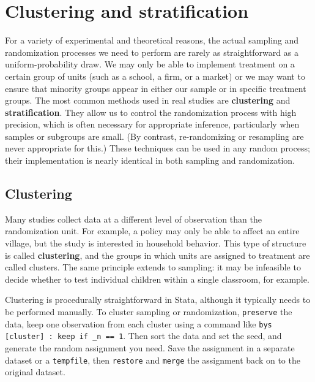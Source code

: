 
\section{Clustering and stratification}

For a variety of experimental and theoretical reasons,
the actual sampling and randomization processes we need to perform
are rarely as straightforward as a uniform-probability draw.
We may only be able to implement treatment on a certain group of units
(such as a school, a firm, or a market)
or we may want to ensure that minority groups appear
in either our sample or in specific treatment groups.
The most common methods used in real studies are \textbf{clustering} and \textbf{stratification}.
They allow us to control the randomization process with high precision,
which is often necessary for appropriate inference,
particularly when samples or subgroups are small.\cite{athey2017econometrics}
(By contrast, re-randomizing or resampling are never appropriate for this.)
These techniques can be used in any random process;
their implementation is nearly identical in both sampling and randomization.

\subsection{Clustering}

Many studies collect data at a different level of observation than the randomization unit.
For example, a policy may only be able to affect an entire village,
but the study is interested in household behavior.
This type of structure is called \textbf{clustering},
and the groups in which units are assigned to treatment are called clusters.
The same principle extends to sampling:
it may be infeasible to decide whether to test individual children
within a single classroom, for example.

Clustering is procedurally straightforward in Stata,
although it typically needs to be performed manually.
To cluster sampling or randomization,
\texttt{preserve} the data, keep one observation from each cluster
using a command like \texttt{bys [cluster] : keep if \_n == 1}.
Then sort the data and set the seed, and generate the random assignment you need.
Save the assignment in a separate dataset or a \texttt{tempfile},
then \texttt{restore} and \texttt{merge} the assignment back on to the original dataset.

